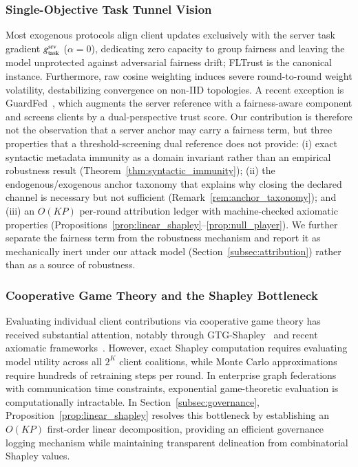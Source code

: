 \subsubsection{Single-Objective Task Tunnel Vision}
Most exogenous protocols align client updates exclusively with the server task gradient $g_{\mathrm{task}}^{\mathrm{srv}}$ ($\alpha = 0$), dedicating zero capacity to group fairness and leaving the model unprotected against adversarial fairness drift; FLTrust is the canonical instance. Furthermore, raw cosine weighting induces severe round-to-round weight volatility, destabilizing convergence on non-IID topologies. A recent exception is GuardFed~\citep{li2025guardfed}, which augments the server reference with a fairness-aware component and screens clients by a dual-perspective trust score. Our contribution is therefore not the observation that a server anchor may carry a fairness term, but three properties that a threshold-screening dual reference does not provide: (i) exact syntactic metadata immunity as a domain invariant rather than an empirical robustness result (Theorem~\ref{thm:syntactic_immunity}); (ii) the endogenous/exogenous anchor taxonomy that explains why closing the declared channel is necessary but not sufficient (Remark~\ref{rem:anchor_taxonomy}); and (iii) an $O(KP)$ per-round attribution ledger with machine-checked axiomatic properties (Propositions~\ref{prop:linear_shapley}--\ref{prop:null_player}). We further separate the fairness term from the robustness mechanism and report it as mechanically inert under our attack model (Section~\ref{subsec:attribution}) rather than as a source of robustness.

\subsubsection{Cooperative Game Theory and the Shapley Bottleneck}
Evaluating individual client contributions via cooperative game theory has received substantial attention, notably through GTG-Shapley~\citep{liu2022gtg} and recent axiomatic frameworks~\citep{tastan2024redefining, shapley1953value}. However, exact Shapley computation requires evaluating model utility across all $2^K$ client coalitions, while Monte Carlo approximations require hundreds of retraining steps per round. In enterprise graph federations with communication time constraints, exponential game-theoretic evaluation is computationally intractable. In Section~\ref{subsec:governance}, Proposition~\ref{prop:linear_shapley} resolves this bottleneck by establishing an $O(KP)$ first-order linear decomposition, providing an efficient governance logging mechanism while maintaining transparent delineation from combinatorial Shapley values.

